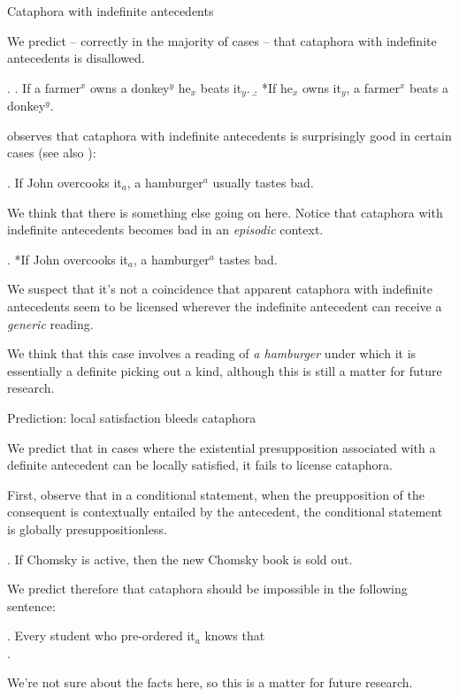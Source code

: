 \documentclass{beamer}
\begin{document}
\begin{frame}[allowframebreaks]{Cataphora with indefinite antecedents}

  We predict -- correctly in the majority of cases -- that cataphora with indefinite antecedents is disallowed.

  \exi.
  \a. If a farmer\(^{x}\) owns a donkey\(^{y}\) he\(_{x}\) beats it\(_{y}\).
  \b. *If he\(_{x}\) owns it\(_{y}\), a farmer\(^{x}\) beats a donkey\(^{y}\).

  \framebreak

  \citet[p.\,192]{chierchia_dynamics_1995} observes that cataphora with indefinite antecedents is surprisingly good in certain cases (see also \citealt{barkerShan2008}):

  \ex. If John overcooks it\(_{a}\), a hamburger\(^{a}\) usually tastes bad.

  \framebreak

  We think that there is something else going on here. Notice that cataphora with indefinite antecedents becomes bad in an \textit{episodic} context.

  \ex. *If John overcooks it\(_{a}\), a hamburger\(^{a}\) tastes bad.

  We suspect that it's not a coincidence that apparent cataphora with indefinite antecedents seem to be licensed wherever the indefinite antecedent can receive a \textit{generic} reading.

  We think that this case involves a reading of \textit{a hamburger} under which it is essentially a definite picking out a kind, although this is still a matter for future research.

\end{frame}

\begin{frame}[allowframebreaks]{Prediction: local satisfaction bleeds cataphora}

  We predict that in cases where the existential presupposition associated with a definite antecedent can be locally satisfied, it fails to license cataphora.

  First, observe that in a conditional statement, when the preupposition of the consequent is contextually entailed by the antecedent, the conditional statement is globally presuppositionless.

  \ex. If Chomsky is active, then the new Chomsky book is sold out.

  \framebreak

  We predict therefore that cataphora should be impossible in the following sentence:

  \ex. Every student who pre-ordered it\(_{a}\) knows that\\
  [If Chomsky is active, then his new book\(^{a}\) is sold out].

  We're not sure about the facts here, so this is a matter for future research.

\end{frame}
\end{document}
